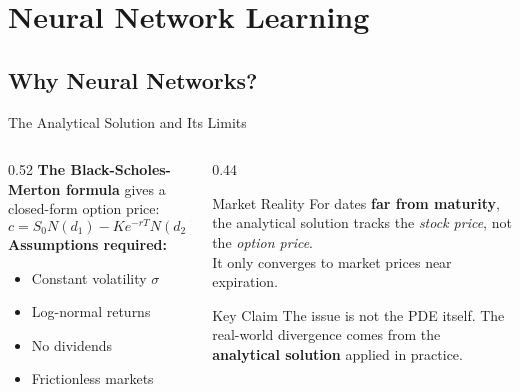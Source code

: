 
\section{Neural Network Learning}
\subsection{Why Neural Networks?}
\begin{frame}{The Analytical Solution and Its Limits}
  \begin{columns}[T]
    \begin{column}{0.52\textwidth}
      \textbf{The Black-Scholes-Merton formula} \cite{black1973} gives a closed-form option price:
      \vspace{0.15em}
      \[
        c = S_0 N(d_1) - K e^{-rT} N(d_2)
      \]
      \vspace{0.05em}
      \textbf{Assumptions required:}
      \begin{itemize}
        \item Constant volatility $\sigma$
        \item Log-normal returns
        \item No dividends
        \item Frictionless markets
      \end{itemize}
    \end{column}
    \begin{column}{0.44\textwidth}
      \begin{alertblock}{Market Reality}
        \small For dates \textbf{far from maturity}, the analytical solution tracks the \emph{stock price}, not the \emph{option price}.\\[0.15em]
        It only converges to market prices near expiration.
      \end{alertblock}
      \vspace{0.2em}
      \begin{exampleblock}{Key Claim \cite{santos2024}}
        \small The issue is not the PDE itself. The real-world divergence comes from the \textbf{analytical solution} applied in practice.
      \end{exampleblock}
    \end{column}
  \end{columns}
\end{frame}
